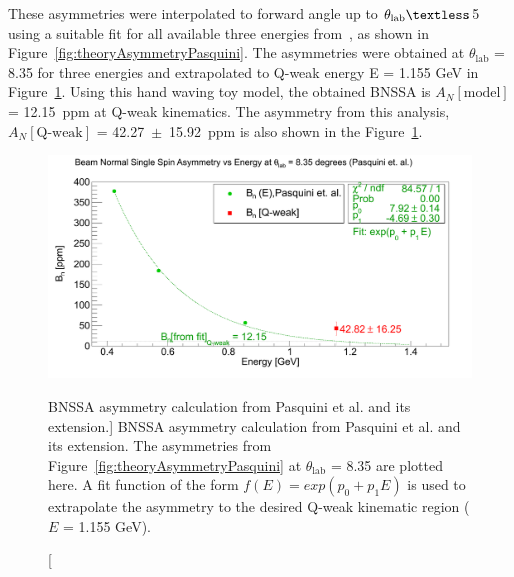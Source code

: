 These asymmetries were interpolated to forward angle up to $\theta_\textrm{lab}\textless$5\degrees{} using a suitable fit for all available three energies from~\cite{presentation:pasquini_Mainz}, as shown in Figure~\ref{fig:theoryAsymmetryPasquini}. The asymmetries were obtained at $\theta_\textrm{lab}$ = 8.35\degrees{} for three energies and extrapolated to Q-weak energy E = 1.155 GeV in Figure~\ref{fig:theoryAsymmetryPasquiniEnergyDependence}. Using this hand waving toy model, the obtained BNSSA is $A_{N}[\textrm{model}]$ = 12.15~ppm at Q-weak kinematics. The asymmetry from this analysis, $A_{N}[\textrm{Q-weak}]$ = 42.27~$\pm$~15.92~ppm is also shown in the Figure~\ref{fig:theoryAsymmetryPasquiniEnergyDependence}.

\begin{figure}[!h]
	\begin{center}
	\includegraphics[width=15.0cm]{figures/theoryAsymmetryPasquiniEnergyDependence}
	\end{center}
	\caption
	[BNSSA asymmetry calculation from Pasquini et al. and its extension.]
	{BNSSA asymmetry calculation from Pasquini et al. and its extension. The asymmetries from Figure~\ref{fig:theoryAsymmetryPasquini} at $\theta_\textrm{lab}$ = 8.35\degrees{} are plotted here. A fit function of the form $f(E) = exp(p_{0}+p_{1}E)$ is used to extrapolate the asymmetry to the desired Q-weak kinematic region ($E$ = 1.155 GeV).}
	\label{fig:theoryAsymmetryPasquiniEnergyDependence}
\end{figure}


%
%


